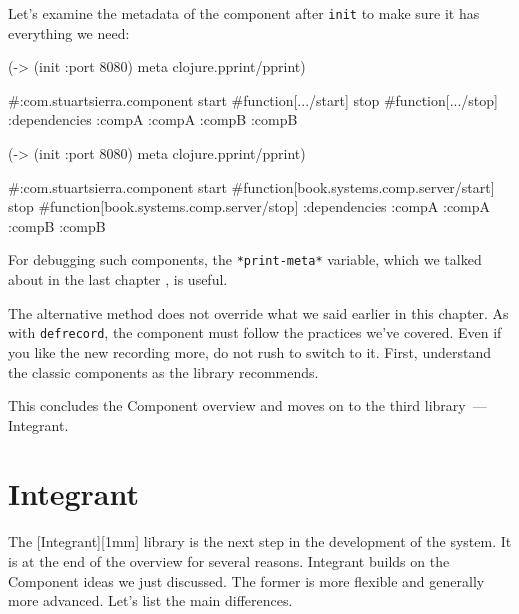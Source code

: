 \fi

Let's examine the metadata of the component after \verb|init| to make sure it has everything we need:

\ifnarrow

\begin{english}
  \begin{clojure}
(-> (init {:port 8080})
    meta
    clojure.pprint/pprint)

#:com.stuartsierra.component
 {start #function[.../start]
  stop  #function[.../stop]
  :dependencies
  {:compA :compA :compB :compB}}
  \end{clojure}
\end{english}

\else

\begin{english}
  \begin{clojure}
(-> (init {:port 8080})
    meta
    clojure.pprint/pprint)

#:com.stuartsierra.component
  {start #function[book.systems.comp.server/start]
   stop #function[book.systems.comp.server/stop]
   :dependencies {:compA :compA :compB :compB}}
  \end{clojure}
\end{english}

\fi


\noindent
For debugging such components, the \verb|*print-meta*| variable, which we talked about in the last chapter , is useful.

The alternative method does not override what we said earlier in this chapter. As with \verb|defrecord|, the component must follow the practices we've covered. Even if you like the new recording more, do not rush to switch to it. First, understand the classic components as the library recommends.

This concludes the Component overview and moves on to the third library~--- Integrant.

\section{Integrant}


The [Integrant][1mm] library is the next step in the development of the system. It is at the end of the overview for several reasons. Integrant builds on the Component ideas we just discussed. The former is more flexible and generally more advanced. Let's list the main differences.

